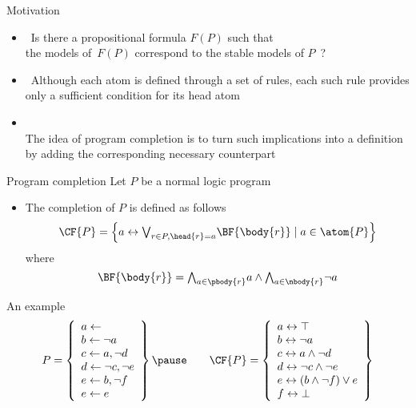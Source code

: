 \begin{frame}{Motivation}
  \bigskip
  \begin{itemize}
  \item<1->  \
    Is there a propositional formula $F(P)$ such that
    \\
    the models of~$F(P)$ correspond to the stable models of $P$~?
    \bigskip
  \item<2->  \
    Although each atom is defined through a set of rules,
    each such rule provides only a \alert{sufficient} condition for its head atom
    \medskip
  \item<3-> \structure{Clark's Idea} \\
    The idea of program completion is to turn such implications into a definition
    by adding the corresponding \alert{necessary} counterpart
  \end{itemize}
\end{frame}
\begin{frame}{Program completion}
  \bigskip
  Let $P$ be a normal logic program
  \bigskip
  \begin{itemize}
  \item
    The \alert{completion}  of $P$ is defined as follows
    \[
    \CF{P}
    =
    \left\{a \leftrightarrow \textstyle{\bigvee_{r\in P, \head{r} = a}} \BF{\body{r}} \mid a\in\atom{P}\right\}
    \]
    where
    \[
    \BF{\body{r}}
    =
    \textstyle{\bigwedge_{a\in\pbody{r}}}      a
    \wedge
    \textstyle{\bigwedge_{a\in\nbody{r}}} \neg a
    \]
  \end{itemize}
\end{frame}
\begin{frame}{An example}
\[
P
=
\left\{
  \begin{array}{l}
    a \leftarrow                \\
    b \leftarrow \neg a         \\
    c \leftarrow a, \neg d      \\
    d \leftarrow \neg c, \neg e \\
    e \leftarrow b, \neg f      \\
    e \leftarrow e
  \end{array}
\right\}
\pause\qquad
\CF{P}
=
\left\{
  \begin{array}{l}
    a \leftrightarrow \top                    \\
    b \leftrightarrow \neg{a}                 \\
    c \leftrightarrow a\wedge \neg{d}         \\
    d \leftrightarrow \neg{c}\wedge \neg{e}   \\
    e \leftrightarrow (b\wedge \neg{f}) \vee e\\
    f \leftrightarrow \bot
  \end{array}
\right\}
\]
\end{frame}
